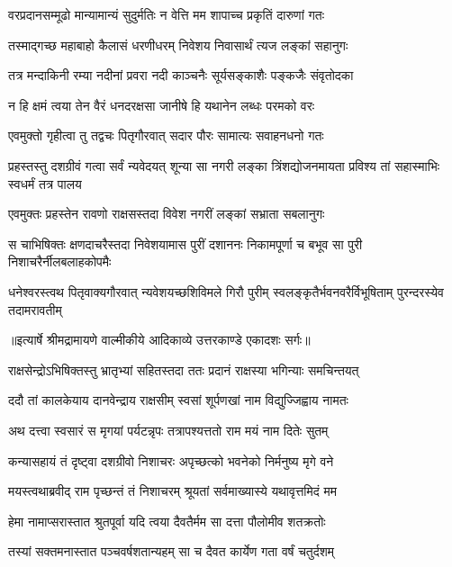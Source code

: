 \twolineshloka
{वरप्रदानसम्मूढो मान्यामान्यं सुदुर्मतिः}
{न वेत्ति मम शापाच्च प्रकृतिं दारुणां गतः} %

\twolineshloka
{तस्माद्गच्छ महाबाहो कैलासं धरणीधरम्}
{निवेशय निवासार्थं त्यज लङ्कां सहानुगः} %

\twolineshloka
{तत्र मन्दाकिनी रम्या नदीनां प्रवरा नदी}
{काञ्चनैः सूर्यसङ्काशैः पङ्कजैः संवृतोदका} %

\twolineshloka
{न हि क्षमं त्वया तेन वैरं धनदरक्षसा}
{जानीषे हि यथानेन लब्धः परमको वरः} %

\twolineshloka
{एवमुक्तो गृहीत्वा तु तद्वचः पितृगौरवात्}
{सदार पौरः सामात्यः सवाहनधनो गतः} %

\threelineshloka
{प्रहस्तस्तु दशग्रीवं गत्वा सर्वं न्यवेदयत्}
{शून्या सा नगरी लङ्का त्रिंशद्योजनमायता}
{प्रविश्य तां सहास्माभिः स्वधर्मं तत्र पालय} %

\twolineshloka
{एवमुक्तः प्रहस्तेन रावणो राक्षसस्तदा}
{विवेश नगरीं लङ्कां सभ्राता सबलानुगः} %

\fourlineindentedshloka
{स चाभिषिक्तः क्षणदाचरैस्तदा}
{निवेशयामास पुरीं दशाननः}
{निकामपूर्णा च बभूव सा पुरी}
{निशाचरैर्नीलबलाहकोपमैः} %

\fourlineindentedshloka
{धनेश्वरस्त्वथ पितृवाक्यगौरवात्}
{न्यवेशयच्छशिविमले गिरौ पुरीम्}
{स्वलङ्कृतैर्भवनवरैर्विभूषिताम्}
{पुरन्दरस्येव तदामरावतीम्} %


{॥इत्यार्षे श्रीमद्रामायणे वाल्मीकीये आदिकाव्ये उत्तरकाण्डे एकादशः सर्गः॥}


\twolineshloka
{राक्षसेन्द्रोऽभिषिक्तस्तु भ्रातृभ्यां सहितस्तदा}
{ततः प्रदानं राक्षस्या भगिन्याः समचिन्तयत्} %

\twolineshloka
{ददौ तां कालकेयाय दानवेन्द्राय राक्षसीम्}
{स्वसां शूर्पणखां नाम विद्युज्जिह्वाय नामतः} %

\twolineshloka
{अथ दत्त्वा स्वसारं स मृगयां पर्यटन्नृपः}
{तत्रापश्यत्ततो राम मयं नाम दितेः सुतम्} %

\twolineshloka
{कन्यासहायं तं दृष्ट्वा दशग्रीवो निशाचरः}
{अपृच्छत्को भवनेको निर्मनुष्य मृगे वने} %

\twolineshloka
{मयस्त्वथाब्रवीद् राम पृच्छन्तं तं निशाचरम्}
{श्रूयतां सर्वमाख्यास्ये यथावृत्तमिदं मम} %

\twolineshloka
{हेमा नामाप्सरास्तात श्रुतपूर्वा यदि त्वया}
{दैवतैर्मम सा दत्ता पौलोमीव शतक्रतोः} %

\twolineshloka
{तस्यां सक्तमनास्तात पञ्चवर्षशतान्यहम्}
{सा च दैवत कार्येण गता वर्षं चतुर्दशम्} %

